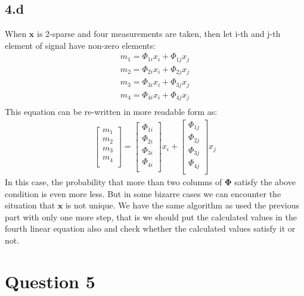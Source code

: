 \documentclass[12pt]{article}
\begin{document}
\subsection*{4.d}
When $\boldsymbol{x}$ is 2-sparse and four measurements are taken, then let i-th and j-th element of signal have non-zero elements:
\begin{align*}
    m_1 = \Phi_{1i}x_i+\Phi_{1j}x_j\\
    m_2 = \Phi_{2i}x_i+\Phi_{2j}x_j\\
    m_3 = \Phi_{3i}x_i+\Phi_{3j}x_j\\
    m_4 = \Phi_{4i}x_i+\Phi_{4j}x_j\\
\end{align*}
This equation can be re-written in more readable form as:
\begin{align*}
    \begin{bmatrix} 
    m_1 \\
    m_2 \\
    m_3 \\
    m_4 \\
    \end{bmatrix} =
    \begin{bmatrix} 
    \Phi_{1i} \\
    \Phi_{2i} \\
    \Phi_{3i} \\
    \Phi_{4i} \\
    \end{bmatrix}x_i +
    \begin{bmatrix} 
    \Phi_{1j} \\
    \Phi_{2j} \\
    \Phi_{3j} \\
    \Phi_{4j} \\
    \end{bmatrix}x_j
\end{align*}
In this case, the probability that more than two columns of $\boldsymbol{\Phi}$ satisfy the above condition is even more less. But in some bizarre cases we can encounter the situation that $\boldsymbol{x}$ is not unique. We have the same algorithm as used the previous part with only one more step, that is we should put the calculated values in the fourth linear equation also and check whether the calculated values satisfy it or not.
\section*{Question 5}
\end{document}
